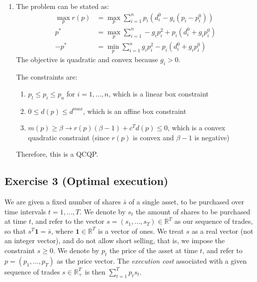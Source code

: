 \documentclass[11pt]{article}
\begin{document}
\begin{solution}
\begin{enumerate}
\item The problem can be stated as:
    \begin{align*}
        \max_{p} r(p) &= \max_{p} \sum_{i=1}^n p_i (d_i^0 - g_i(p_i - p_i^0)) \\
        p^* &= \max_{p} \sum_{i=1}^n -g_i p_i^2 + p_i(d_i^0 + g_i p_i^0) \\
        -p^* &= \min_p \sum_{i=1}^n g_i p_i^2 - p_i(d_i^0 + g_i p_i^0)
    \end{align*}
    The objective is quadratic and convex because $g_i > 0$.

    The constraints are:
        \begin{enumerate}
        \item $p_l \leq p_i \leq p_u$ for $i = 1, \dots, n$, which is a linear box constraint
        \item $0 \leq d(p) \leq d^{max}$, which is an affine box constraint
        \item $m(p) \geq \beta \rightarrow r(p)(\beta - 1) + c^T d(p) \leq 0$, which is a convex quadratic constraint (since $r(p)$ is convex and $\beta - 1$ is negative)
        \end{enumerate}
    Therefore, this is a QCQP.
\end{enumerate}
\end{solution}

\newpage
\subsection*{Exercise 3 (Optimal execution)}

We are given a fixed number of shares $\bar{s}$ of a single asset, to be purchased over time intervals $t=1,\ldots,T$.  We denote by $s_t$ the amount of shares to be purchased at time $t$, and refer to
the vector $s=(s_1,\ldots,s_T) \in \mathbb{R}^{T}$ as our sequence of trades, so that $s^T \mathbf{1} = \bar{s}$, where $\mathbf{1} \in \mathbb{R}^{T}$ is a vector of ones.  We treat $s$ as a real vector (not an integer vector), and do not allow short selling, that is, we impose the constraint $s \ge 0$. We denote by $p_t$ the price of the asset at time $t$, and refer to $p = (p_1,\ldots,p_T)$ as the price vector.  The {\em execution cost} associated with a given sequence of trades $s \in \mathbb{R}_{+}^{T}$ is then $\sum_{t=1}^T  p_t s_t$.
\end{document}
